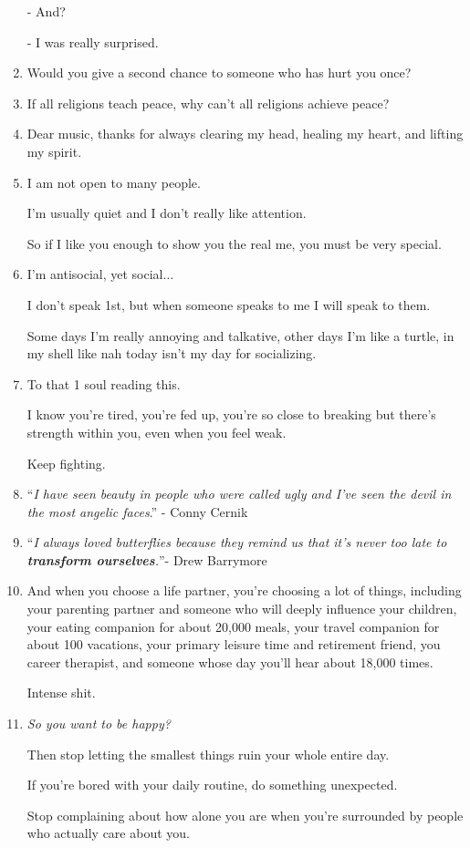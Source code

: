 \documentclass{article}
\begin{document}
\begin{enumerate}
	- And?
	
	- I was really surprised.
	\item Would you give a second chance to someone who has hurt you once?
	\item If all religions teach peace, why can't all religions achieve peace?
	\item Dear music, thanks for always clearing my head, healing my heart, and lifting my spirit.
	\item I am not open to many people.
	
	I'm usually quiet and I don't really like attention.
	
	So if I like you enough to show you the real me, you must be very special.
	\item I'm antisocial, yet social$\ldots$
	
	I don't speak 1st, but when someone speaks to me I will speak to them.
	
	Some days I'm really annoying and talkative, other days I'm like a turtle, in my shell like nah today isn't my day for socializing.
	\item To that 1 soul reading this.
	
	I know you're tired, you're fed up, you're so close to breaking but there's strength within you, even when you feel weak.
	
	Keep fighting.
	\item ``\textit{I have seen beauty in people who were called ugly and I've seen the devil in the most angelic faces}.'' - Conny Cernik
	\item ``\textit{I always loved butterflies because they remind us that it's never too late to \textbf{transform ourselves}.}''- Drew Barrymore
	\item And when you choose a life partner, you're choosing a lot of things, including your parenting partner and someone who will deeply influence your children, your eating companion for about 20,000 meals, your travel companion for about 100 vacations, your primary leisure time and retirement friend, you career therapist, and someone whose day you'll hear about 18,000 times.
	
	Intense shit.
	\item \textit{So you want to be happy?}
	
	Then stop letting the smallest things ruin your whole entire day.
	
	If you're bored with your daily routine, do something unexpected.
	
	Stop complaining about how alone you are when you're surrounded by people who actually care about you.
	

\end{enumerate}
\end{document}
